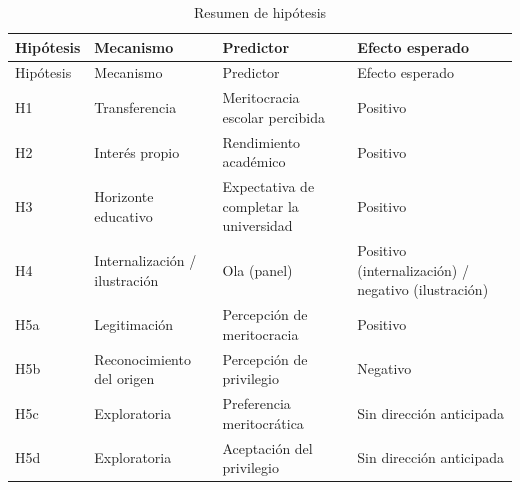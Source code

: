 \documentclass[
  spanish,
  a4paper,
  oneside]{scrbook}
\begin{document}
\begin{longtable}[]{@{}
  >{\raggedright\arraybackslash}p{}
  >{\raggedright\arraybackslash}p{}
  >{\raggedright\arraybackslash}p{}
  >{\raggedright\arraybackslash}p{}@{}}
\caption{Resumen de hipótesis}\label{tbl-hipotesis}\tabularnewline
\toprule\noalign{}
\begin{minipage}[b]{\linewidth}\raggedright
Hipótesis
\end{minipage} & \begin{minipage}[b]{\linewidth}\raggedright
Mecanismo
\end{minipage} & \begin{minipage}[b]{\linewidth}\raggedright
Predictor
\end{minipage} & \begin{minipage}[b]{\linewidth}\raggedright
Efecto esperado
\end{minipage} \\
\midrule\noalign{}
\endfirsthead
\toprule\noalign{}
\begin{minipage}[b]{\linewidth}\raggedright
Hipótesis
\end{minipage} & \begin{minipage}[b]{\linewidth}\raggedright
Mecanismo
\end{minipage} & \begin{minipage}[b]{\linewidth}\raggedright
Predictor
\end{minipage} & \begin{minipage}[b]{\linewidth}\raggedright
Efecto esperado
\end{minipage} \\
\midrule\noalign{}
\endhead
\bottomrule\noalign{}
\endlastfoot
H1 & Transferencia & Meritocracia escolar percibida & Positivo \\
H2 & Interés propio & Rendimiento académico & Positivo \\
H3 & Horizonte educativo & Expectativa de completar la universidad &
Positivo \\
H4 & Internalización / ilustración & Ola (panel) & Positivo
(internalización) / negativo (ilustración) \\
H5a & Legitimación & Percepción de meritocracia & Positivo \\
H5b & Reconocimiento del origen & Percepción de privilegio & Negativo \\
H5c & Exploratoria & Preferencia meritocrática & Sin dirección
anticipada \\
H5d & Exploratoria & Aceptación del privilegio & Sin dirección
anticipada \\
\end{longtable}
\end{document}
